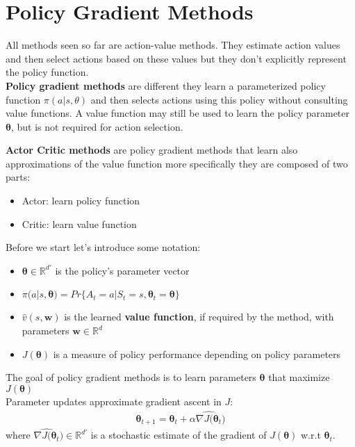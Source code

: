 \section{Policy Gradient Methods}
All methods seen so far are action-value methods. They estimate action values and then select actions based on these values but they don't explicitly represent the policy function.\\

\textbf{Policy gradient methods} are different they learn a parameterized policy function $\pi(a|s, \theta)$ and then selects actions using this policy without consulting value functions. A value
function may still be used to learn the policy parameter $\bm{\theta}$, but is not required for action selection.

\textbf{Actor Critic methods} are policy gradient methods that learn also approximations of the value function more specifically they are composed of two parts:
\begin{itemize}
    \item Actor: learn policy function
    \item Critic: learn value function
\end{itemize}

Before we start let's introduce some notation:
\begin{itemize}
    \item $\bm{\theta}\in\mathbb{R}^{d'}$ is the policy's parameter vector
    \item $\pi(a|s, \bm{\theta})=Pr\{A_t=a|S_t=s,\bm{\theta}_t=\bm{\theta}\}$
    \item $\hat{v}(s, \bm{w})$ is the learned \textbf{value function}, if required by the method, with parameters $\bm{w}\in\mathbb{R}^{d}$
    \item $J(\bm{\theta})$ is a measure of policy performance depending on policy parameters
\end{itemize}

The goal of policy gradient methods is to learn parameters $\bm{\theta}$ that maximize $J(\bm{\theta})$\\

Parameter updates approximate gradient ascent in $J$:
\begin{align}
    \bm{\theta}_{t+1}=\bm{\theta}_t+\alpha\widehat{\nabla J(\bm{\theta}_t})
\end{align}
where $\widehat{\nabla J(\bm{\theta}_t})\in \mathbb{R}^{d'}$ is a stochastic estimate of the gradient of $J(\bm{\theta})$ w.r.t $\bm{\theta}_t$.


